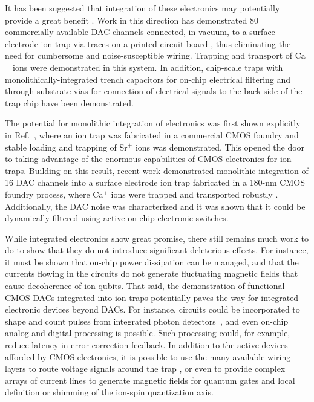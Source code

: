 \documentclass[%
12pt,
 amsmath,amssymb,
]{revtex4-2}
\begin{document}
It has been suggested that integration of these electronics may potentially provide a great benefit \cite{GuiseInVacElec2014, mehta_cmos_2014, LekitscheMicrowaveBlueprint2017, StuartDACTRap2018}.  Work in this direction has demonstrated 80 commercially-available DAC channels connected, in vacuum, to a surface-electrode ion trap via traces on a printed circuit board \cite{GuiseInVacElec2014}, thus eliminating the need for cumbersome and noise-susceptible wiring.  Trapping and transport of Ca$^+$ ions were demonstrated in this system.  In addition, chip-scale traps with monolithically-integrated trench capacitors for on-chip electrical filtering \cite{Allcock2012, GuiseBallGrid2015} and through-substrate vias for connection of electrical signals to the back-side of the trap chip \cite{GuiseBallGrid2015} have been demonstrated.

The potential for monolithic integration of electronics was first shown explicitly in Ref.~\cite{mehta_cmos_2014}, where an ion trap was fabricated in a commercial CMOS foundry and stable loading and trapping of Sr$^+$ ions was demonstrated.  This opened the door to taking advantage of the enormous capabilities of CMOS electronics for ion traps.  Building on this result, recent work demonstrated monolithic integration of 16 DAC channels into a surface electrode ion trap fabricated in a 180-nm CMOS foundry process, where Ca$^+$ ions were trapped and transported robustly \cite{StuartDACTRap2018}.  Additionally, the DAC noise was characterized and it was shown that it could be dynamically filtered using active on-chip electronic switches.

While integrated electronics show great promise, there still remains much work to do to show that they do not introduce significant deleterious effects.  For instance, it must be shown that on-chip power dissipation can be managed, and that the currents flowing in the circuits do not generate fluctuating magnetic fields that cause decoherence of ion qubits. That said, the demonstration of functional CMOS DACs integrated into ion traps potentially paves the way for integrated electronic devices beyond DACs.  For instance, circuits could be incorporated to shape and count pulses from integrated photon detectors~\cite{MehtaThesis2017}, and even on-chip analog and digital processing is possible.  Such processing could, for example, reduce latency in error correction feedback. In addition to the active devices afforded by CMOS electronics, it is possible to use the many available wiring layers to route voltage signals around the trap \cite{mehta_cmos_2014, StuartDACTRap2018}, or even to provide complex arrays of current lines to generate magnetic fields for quantum gates and local definition or shimming of the ion-spin quantization axis.
\end{document}
